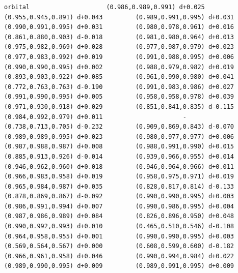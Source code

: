 \documentclass[11pt, letterpaper, openany]{book}
\begin{document}
\begin{empiricalbox}
\begin{lstlisting}[style=terminal]
orbital                     (0.986,0.989,0.991) d+0.025         (0.955,0.945,0.891) d+0.043         (0.989,0.991,0.995) d+0.031         (0.990,0.991,0.995) d+0.031         (0.980,0.978,0.961) d+0.016         (0.861,0.880,0.903) d-0.018         (0.981,0.980,0.964) d+0.013         (0.975,0.982,0.969) d+0.028         (0.977,0.987,0.979) d+0.023         (0.977,0.983,0.992) d+0.019         (0.991,0.988,0.995) d+0.006         (0.990,0.990,0.995) d+0.002         (0.988,0.979,0.982) d+0.019         (0.893,0.903,0.922) d+0.085         (0.961,0.990,0.980) d+0.041         (0.772,0.763,0.763) d-0.190         (0.991,0.983,0.986) d+0.027         (0.991,0.990,0.995) d+0.005         (0.958,0.958,0.978) d+0.039         (0.971,0.930,0.918) d+0.029         (0.851,0.841,0.835) d-0.115         (0.984,0.992,0.979) d+0.011                      -                      (0.738,0.713,0.705) d-0.232         (0.909,0.869,0.843) d-0.070         (0.989,0.989,0.995) d+0.023         (0.980,0.977,0.977) d+0.006         (0.987,0.988,0.987) d+0.008         (0.988,0.991,0.990) d+0.015         (0.885,0.913,0.926) d-0.014         (0.939,0.966,0.955) d+0.014         (0.946,0.962,0.960) d+0.018         (0.946,0.964,0.966) d+0.011         (0.966,0.983,0.958) d+0.019         (0.958,0.975,0.971) d+0.019         (0.965,0.984,0.987) d+0.035         (0.828,0.817,0.814) d-0.133         (0.878,0.869,0.867) d-0.092         (0.990,0.990,0.995) d+0.003         (0.986,0.991,0.994) d+0.007         (0.990,0.986,0.995) d+0.004         (0.987,0.986,0.989) d+0.084         (0.826,0.896,0.950) d+0.048         (0.990,0.992,0.993) d+0.010         (0.465,0.510,0.546) d-0.108         (0.964,0.958,0.955) d+0.001         (0.990,0.990,0.995) d+0.003         (0.569,0.564,0.567) d+0.000         (0.608,0.599,0.600) d-0.182         (0.966,0.961,0.958) d+0.046         (0.990,0.994,0.984) d+0.022         (0.989,0.990,0.995) d+0.009         (0.989,0.991,0.995) d+0.009     

\end{lstlisting}
\end{empiricalbox}
\end{document}
